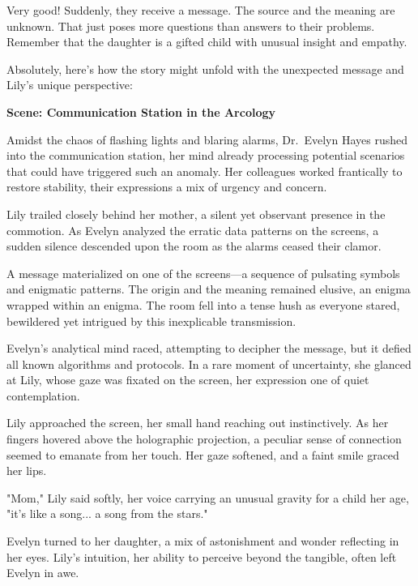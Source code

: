 \begin{qquote}
    Very good! Suddenly, they receive a message. The source and the meaning are unknown. That just poses more questions than answers to their problems. Remember that the daughter is a gifted child with unusual insight and empathy.
\end{qquote}

\begin{aquote}
    Absolutely, here's how the story might unfold with the unexpected message and Lily's unique perspective:\medskip

    \noindent\textbf{Scene: Communication Station in the Arcology}

    Amidst the chaos of flashing lights and blaring alarms, Dr.~Evelyn Hayes rushed into the communication station, her mind already processing potential scenarios that could have triggered such an anomaly. Her colleagues worked frantically to restore stability, their expressions a mix of urgency and concern.

    Lily trailed closely behind her mother, a silent yet observant presence in the commotion. As Evelyn analyzed the erratic data patterns on the screens, a sudden silence descended upon the room as the alarms ceased their clamor.

    A message materialized on one of the screens—a sequence of pulsating symbols and enigmatic patterns. The origin and the meaning remained elusive, an enigma wrapped within an enigma. The room fell into a tense hush as everyone stared, bewildered yet intrigued by this inexplicable transmission.

    Evelyn's analytical mind raced, attempting to decipher the message, but it defied all known algorithms and protocols. In a rare moment of uncertainty, she glanced at Lily, whose gaze was fixated on the screen, her expression one of quiet contemplation.

    Lily approached the screen, her small hand reaching out instinctively. As her fingers hovered above the holographic projection, a peculiar sense of connection seemed to emanate from her touch. Her gaze softened, and a faint smile graced her lips.

    "Mom," Lily said softly, her voice carrying an unusual gravity for a child her age, "it's like a song... a song from the stars."

    Evelyn turned to her daughter, a mix of astonishment and wonder reflecting in her eyes. Lily's intuition, her ability to perceive beyond the tangible, often left Evelyn in awe.


\end{aquote}
